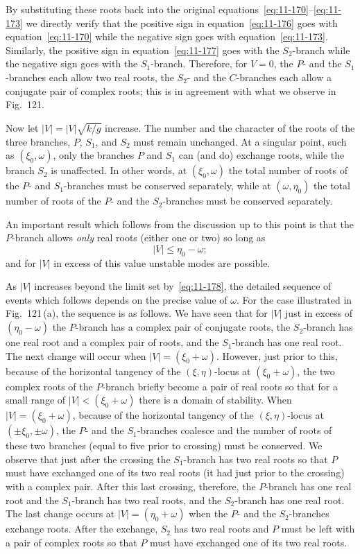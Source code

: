 By substituting these roots back into the original equations~\eqref{eq:11-170}--\eqref{eq:11-173} we directly verify that the positive sign in equation~\eqref{eq:11-176} goes with equation~\eqref{eq:11-170} while the negative sign goes with equation~\eqref{eq:11-173}. Similarly, the positive sign in equation~\eqref{eq:11-177} goes with the $S_2$-branch while the negative sign goes with the $S_1$-branch. Therefore, for $V = 0$, the $P$- and the $S_1$-branches each allow two real roots, the $S_2$- and the $C$-branches each allow a conjugate pair of complex roots; this is in agreement with what we observe in Fig.\ 121.

Now let $|V| = |V|\sqrt{k/g}$ increase. The number and the character of the roots of the three branches, $P$, $S_1$, and $S_2$ must remain unchanged. At a singular point, such as $(\xi_0,\omega)$, only the branches $P$ and $S_1$ can (and do) exchange roots, while the branch $S_2$ is unaffected. In other words, at $(\xi_0,\omega)$ the total number of roots of the $P$- and $S_1$-branches must be conserved separately, while at $(\omega,\eta_0)$ the total number of roots of the $P$- and the $S_2$-branches must be conserved separately.

An important result which follows from the discussion up to this point is that the $P$-branch allows \textit{only} real roots (either one or two) so long as
\begin{equation}
\label{eq:11-178}
|V| \leqslant \eta_0-\omega;
\end{equation}
and for $|V|$ in excess of this value unstable modes are possible.

As $|V|$ increases beyond the limit set by~\eqref{eq:11-178}, the detailed sequence of events which follows depends on the precise value of $\omega$. For the case illustrated in Fig.~121\,(a), the sequence is as follows. We have seen that for $|V|$ just in excess of $(\eta_0-\omega)$ the $P$-branch has a complex pair of conjugate roots, the $S_2$-branch has one real root and a complex pair of roots, and the $S_1$-branch has one real root. The next change will occur when $|V| = (\xi_0+\omega)$. However, just prior to this, because of the horizontal tangency of the $(\xi,\eta)$-locus at $(\xi_0+\omega)$, the two complex roots of the $P$-branch briefly become a pair of real roots so that for a small range of $|V| < (\xi_0+\omega)$ there is a domain of stability. When $|V| = (\xi_0+\omega)$, because of the horizontal tangency of the $(\xi,\eta)$-locus at $(\pm\xi_0,\pm\omega)$, the $P$- and the $S_1$-branches coalesce and the number of roots of these two branches (equal to five prior to crossing) must be conserved. We observe that just after the crossing the $S_1$-branch has two real roots so that $P$ must have exchanged one of its two real roots (it had just prior to the crossing) with a complex pair. After this last crossing, therefore, the $P$-branch has one real root and the $S_1$-branch has two real roots, and the $S_2$-branch has one real root. The last change occurs at $|V| = (\eta_0+\omega)$ when the $P$- and the $S_2$-branches exchange roots. After the exchange, $S_2$ has two real roots and $P$ must be left with a pair of complex roots so that $P$ must have exchanged one of its two real roots.

